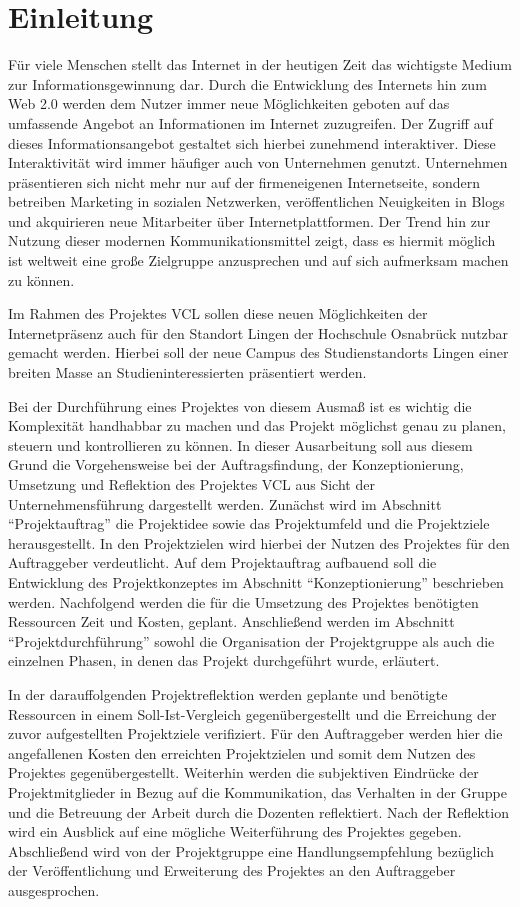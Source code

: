 \section{Einleitung}
\label{sec:Einleitung}
Für viele Menschen stellt das Internet in der heutigen Zeit das wichtigste
Medium zur Informationsgewinnung dar. Durch die Entwicklung des Internets hin
zum Web 2.0 werden dem Nutzer immer neue Möglichkeiten geboten auf das
umfassende Angebot an Informationen im Internet zuzugreifen. Der Zugriff auf
dieses Informationsangebot gestaltet sich hierbei zunehmend interaktiver.
Diese Interaktivität wird immer häufiger auch von Unternehmen genutzt.
Unternehmen präsentieren sich nicht mehr nur auf der firmeneigenen
Internetseite, sondern betreiben Marketing in sozialen Netzwerken,
veröffentlichen Neuigkeiten in Blogs und akquirieren neue Mitarbeiter über
Internetplattformen. Der Trend hin zur Nutzung dieser modernen
Kommunikationsmittel zeigt, dass es hiermit möglich ist weltweit eine große
Zielgruppe anzusprechen und auf sich aufmerksam machen zu können.

Im Rahmen des Projektes \ac{VCL} sollen diese neuen
Möglichkeiten der Internetpräsenz auch für den Standort Lingen der Hochschule
Osnabrück nutzbar gemacht werden. Hierbei soll der neue Campus des
Studienstandorts Lingen einer breiten Masse an Studieninteressierten
präsentiert werden.

Bei der Durchführung eines Projektes von diesem Ausmaß ist es wichtig die
Komplexität handhabbar zu machen und das Projekt möglichst genau zu planen,
steuern und kontrollieren zu können. In dieser Ausarbeitung soll aus diesem
Grund die Vorgehensweise bei der Auftragsfindung, der Konzeptionierung,
Umsetzung und Reflektion des Projektes \acs{VCL} aus Sicht der
Unternehmensführung dargestellt werden. Zunächst wird im Abschnitt
"`Projektauftrag"' die Projektidee sowie das Projektumfeld und die Projektziele
herausgestellt. In den Projektzielen wird hierbei der Nutzen des Projektes
für den Auftraggeber verdeutlicht. Auf dem Projektauftrag aufbauend soll
die Entwicklung des Projektkonzeptes im Abschnitt "`Konzeptionierung"'
beschrieben werden. Nachfolgend werden die für die Umsetzung des Projektes
benötigten Ressourcen Zeit und Kosten, geplant. Anschließend werden im Abschnitt
"`Projektdurchführung"' sowohl die Organisation der Projektgruppe als auch die
einzelnen Phasen, in denen das Projekt durchgeführt wurde, erläutert.  

In der darauffolgenden Projektreflektion werden geplante und benötigte
Ressourcen in einem Soll-Ist-Vergleich gegenübergestellt und die Erreichung der zuvor
aufgestellten Projektziele verifiziert. Für den Auftraggeber werden hier die
angefallenen Kosten den erreichten Projektzielen und somit dem Nutzen des
Projektes gegenübergestellt. Weiterhin werden die subjektiven Eindrücke der
Projektmitglieder in Bezug auf die Kommunikation, das Verhalten in der Gruppe
und die Betreuung der Arbeit durch die Dozenten reflektiert. Nach der
Reflektion wird ein Ausblick auf eine mögliche Weiterführung des Projektes
gegeben. Abschließend wird von der Projektgruppe eine Handlungsempfehlung
bezüglich der Veröffentlichung und Erweiterung des Projektes an den Auftraggeber
ausgesprochen.